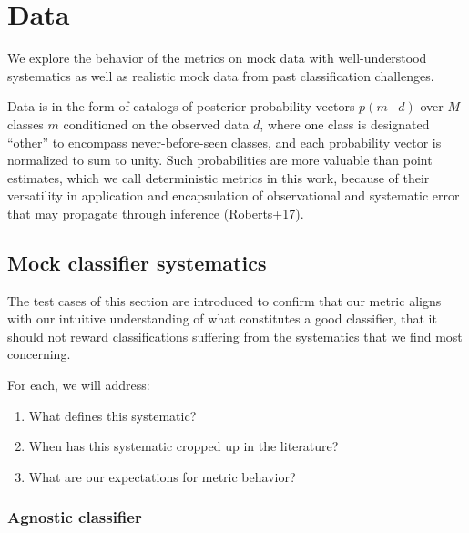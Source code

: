 \section{Data}
\label{sec:data}

We explore the behavior of the metrics on mock data with well-understood systematics as well as realistic mock data from past classification challenges.

Data is in the form of catalogs of posterior probability vectors $p(m \mid d)$ over $M$ classes $m$ conditioned on the observed data $d$, where one class is designated ``other'' to encompass never-before-seen classes, and each probability vector is normalized to sum to unity.
Such probabilities are more valuable than point estimates, which we call deterministic metrics in this work, because of their versatility in application and encapsulation of observational and systematic error that may propagate through inference (Roberts+17).

\subsection{Mock classifier systematics}
\label{sec:mockdata}

The test cases of this section are introduced to confirm that our metric aligns with our intuitive understanding of what constitutes a good classifier, that it should not reward classifications suffering from the systematics that we find most concerning.

For each, we will address:
\begin{enumerate}
  \item What defines this systematic?
  \item When has this systematic cropped up in the literature?
  \item What are our expectations for metric behavior?
\end{enumerate}



\subsubsection{Agnostic classifier}
\label{sec:agnostic_data}

